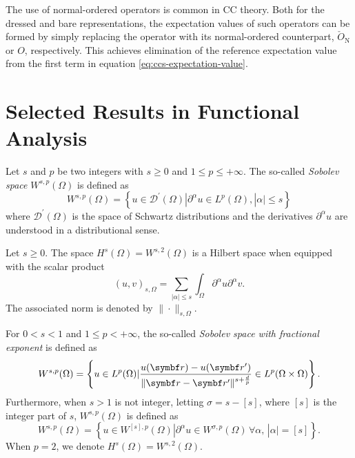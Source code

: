 The use of normal-ordered operators is common in \acrlong*{CC} theory. Both for
the dressed and bare representations, the expectation values of such operators
can be formed by simply replacing the operator with its normal-ordered counterpart,
$\check{O}_\mathrm{N}$ or $O$, respectively.
This achieves elimination of the reference expectation value from the first
term in equation \eqref{eq:ccs-expectation-value}.

\section{Selected Results in Functional Analysis}

\begin{defin}
Let $s$ and $p$ be two integers with $s\geq 0$ and $1\leq p \leq +\infty$.
The so-called \emph{Sobolev space} $W^{s, p}(\Omega)$ is defined as
\begin{equation}
W^{s,p}(\Omega) =
\left\lbrace
u \in \mathcal{D}^\prime(\Omega) | \partial^\alpha u \in L^p(\Omega), |\alpha|\leq s
\right\rbrace
\end{equation}
where $\mathcal{D}^\prime(\Omega)$ is the space of Schwartz distributions and the
derivatives $\partial^\alpha u$ are understood in a distributional sense.
\end{defin}

\begin{lemma}
Let $s\geq 0$. The space $H^s(\Omega) = W^{s, 2}(\Omega)$ is a Hilbert space
when equipped with the scalar product
\begin{equation}
(u, v)_{s, \Omega} = \sum_{|\alpha|\leq s}\int_\Omega\partial^\alpha u \partial^\alpha v.
\end{equation}
The associated norm is denoted by $\| \cdot \|_{s, \Omega}$.
\end{lemma}

\begin{defin}
For $0 < s < 1$ and $1 \leq p < +\infty$, the so-called \emph{Sobolev space with fractional
exponent} is defined as
\begin{equation}
W^{s, p}(\Omega) =
\left\lbrace
u \in L^p(\Omega) |
\frac{u(\vect{r}) - u(\vect{r}^\prime)}{\| \vect{r} - \vect{r}^\prime\|^{s+\frac{d}{p}}}
\in L^p(\Omega \times \Omega)
\right\rbrace.
\end{equation}
Furthermore, when $s> 1$ is not integer, letting $\sigma = s - [s]$, where $[s]$ is the integer
part of $s$, $W^{s,p}(\Omega)$ is defined as
\begin{equation}
W^{s, p}(\Omega) =
\left\lbrace
u \in W^{[s], p}(\Omega) |
\partial^\alpha u \in W^{\sigma, p}(\Omega)\, \forall \alpha,\, |\alpha| = [s]
\right\rbrace.
\end{equation}
When $p=2$, we denote $H^s(\Omega) = W^{s,2}(\Omega)$.
\end{defin}


